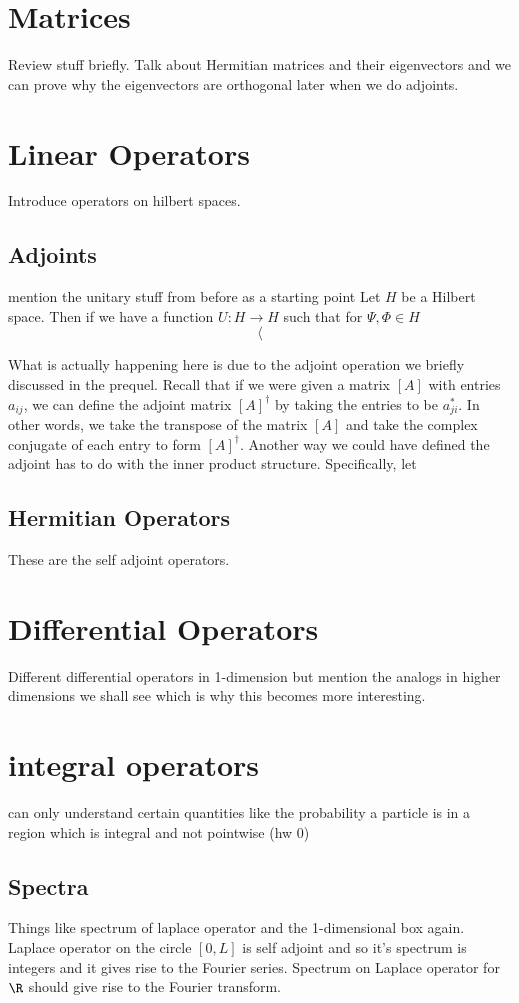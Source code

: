 \section{Matrices}
Review stuff briefly. Talk about Hermitian matrices and their eigenvectors and we can prove why the eigenvectors are orthogonal later when we do adjoints. 

\section{Linear Operators}
Introduce operators on hilbert spaces.

\subsection{Adjoints}
mention the unitary stuff from before as a starting point
Let $H$ be a Hilbert space. Then if we have a function $U\colon H \to H$ such that for $\Psi,\Phi \in H$
\[
\langle
\]

What is actually happening here is due to the adjoint operation we briefly discussed in the prequel. Recall that if we were given a matrix $[A]$ with entries $a_{ij}$, we can define the adjoint matrix $[A]^\dagger$ by taking the entries to be $a_{ji}^*$. In other words, we take the transpose of the matrix $[A]$ and take the complex conjugate of each entry to form $[A]^\dagger$.  Another way we could have defined the adjoint has to do with the inner product structure.  Specifically, let

\subsection{Hermitian Operators}
These are the self adjoint operators.

\section{Differential Operators}
Different differential operators in 1-dimension but mention the analogs in higher dimensions we shall see which is why this becomes more interesting. 

\section{integral operators}

can only understand certain quantities like the probability a particle is in a region which is integral and not pointwise (hw 0)

\subsection{Spectra}

Things like spectrum of laplace operator and the 1-dimensional box again. Laplace operator on the circle $[0,L]$ is self adjoint and so it's spectrum is integers and it gives rise to the Fourier series.  Spectrum on Laplace operator for $\R$ should give rise to the Fourier transform.  